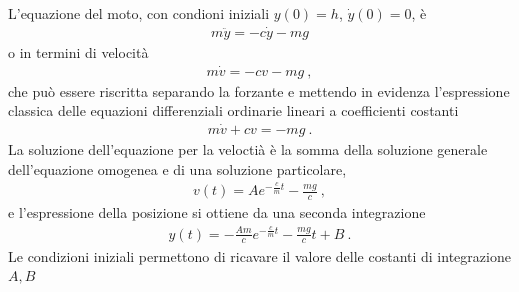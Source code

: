 \documentclass[letterpaper,10pt,italian]{jupyterBook}
\begin{document}
\sphinxAtStartPar
{} L’equazione del moto, con condioni iniziali \(y(0) = h\), \(\dot{y}(0) = 0\), è
\begin{equation*}
\begin{split}m \ddot{y} = - c \dot{y} - m g\end{split}
\end{equation*}
\sphinxAtStartPar
o in termini di velocità
\begin{equation*}
\begin{split}m \dot{v} = - c v - m g \ ,\end{split}
\end{equation*}
\sphinxAtStartPar
che può essere riscritta separando la forzante e mettendo in evidenza l’espressione classica delle equazioni differenziali ordinarie lineari a coefficienti costanti
\begin{equation*}
\begin{split}m \dot{v} + c v = - m g \ .\end{split}
\end{equation*}
\sphinxAtStartPar
La soluzione dell’equazione per la veloctià è la somma della soluzione generale dell’equazione omogenea e di una soluzione particolare,
\begin{equation*}
\begin{split}v(t) = A e^{-\frac{c}{m}t} - \frac{mg}{c} \ ,\end{split}
\end{equation*}
\sphinxAtStartPar
e l’espressione della posizione si ottiene da una seconda integrazione
\begin{equation*}
\begin{split}y(t) = - \frac{A m }{c} e^{-\frac{c}{m}t} - \frac{mg}{c}t + B \ .\end{split}
\end{equation*}
\sphinxAtStartPar
Le condizioni iniziali permettono di ricavare il valore delle costanti di integrazione \(A, B\)
\end{document}
